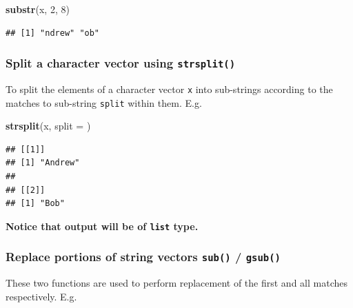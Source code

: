 \documentclass[
]{book}
\newenvironment{Shaded}{\begin{snugshade}}{\end{snugshade}}
\newcommand{\AttributeTok}[1]{\textcolor[rgb]{0.13,0.29,0.53}{#1}}
\newcommand{\DecValTok}[1]{\textcolor[rgb]{0.00,0.00,0.81}{#1}}
\newcommand{\FunctionTok}[1]{\textcolor[rgb]{0.13,0.29,0.53}{\textbf{#1}}}
\newcommand{\NormalTok}[1]{#1}
\newcommand{\StringTok}[1]{\textcolor[rgb]{0.31,0.60,0.02}{#1}}
\begin{document}
\begin{Shaded}
\begin{Highlighting}[]
\FunctionTok{substr}\NormalTok{(x, }\DecValTok{2}\NormalTok{, }\DecValTok{8}\NormalTok{)}
\end{Highlighting}
\end{Shaded}

\begin{verbatim}
## [1] "ndrew" "ob"
\end{verbatim}

\hypertarget{split-a-character-vector-using-strsplit}{%
\subsubsection*{\texorpdfstring{Split a character vector using \texttt{strsplit()}}{Split a character vector using strsplit()}}\label{split-a-character-vector-using-strsplit}}

To split the elements of a character vector \texttt{x} into sub-strings according to the matches to sub-string \texttt{split} within them. E.g.

\begin{Shaded}
\begin{Highlighting}[]
\FunctionTok{strsplit}\NormalTok{(x, }\AttributeTok{split =} \StringTok{\textquotesingle{} \textquotesingle{}}\NormalTok{)}
\end{Highlighting}
\end{Shaded}

\begin{verbatim}
## [[1]]
## [1] "Andrew"
## 
## [[2]]
## [1] "Bob"
\end{verbatim}

\textbf{Notice that output will be of \texttt{list} type.}

\hypertarget{replace-portions-of-string-vectors-sub-gsub}{%
\subsubsection*{\texorpdfstring{Replace portions of string vectors \texttt{sub()} / \texttt{gsub()}}{Replace portions of string vectors sub() / gsub()}}\label{replace-portions-of-string-vectors-sub-gsub}}

These two functions are used to perform replacement of the first and all matches respectively. E.g.
\end{document}
